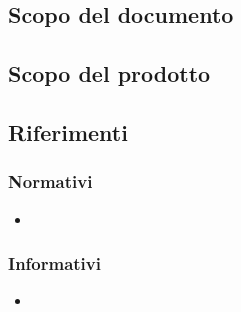 \subsection{Scopo del documento}

\subsection{Scopo del prodotto}

\subsection{Riferimenti}

\subsubsection{Normativi}
\begin{itemize}
\item
\end{itemize}

\subsubsection{Informativi}
\begin{itemize}
\item
\end{itemize}